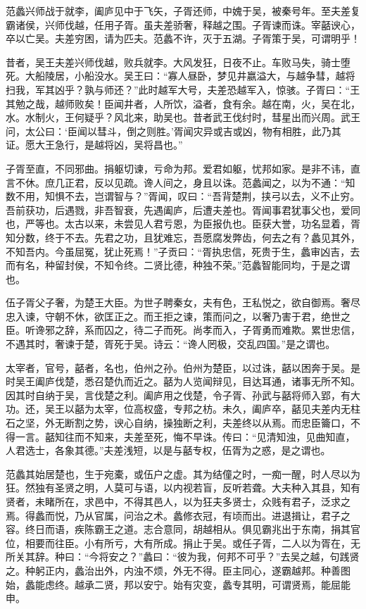 \documentclass[12pt,UTF8]{ctexbook}
\begin{document}
范蠡兴师战于就李，阖庐见中于飞矢，子胥还师，中媿于吴，被秦号年。至夫差复霸诸侯，兴师伐越，任用子胥。虽夫差骄奢，释越之围。子胥谏而诛。宰嚭谀心，卒以亡吴。夫差穷困，请为匹夫。范蠡不许，灭于五湖。子胥策于吴，可谓明乎！

昔者，吴王夫差兴师伐越，败兵就李。大风发狂，日夜不止。车败马失，骑士堕死。大船陵居，小船没水。吴王曰：“寡人昼卧，梦见井嬴溢大，与越争彗，越将扫我，军其凶乎？孰与师还？”此时越军大号，夫差恐越军入，惊骇。子胥曰：“王其勉之哉，越师败矣！臣闻井者，人所饮，溢者，食有余。越在南，火，吴在北，水。水制火，王何疑乎？风北来，助吴也。昔者武王伐纣时，彗星出而兴周。武王问，太公曰：‘臣闻以彗斗，倒之则胜。’胥闻灾异或吉或凶，物有相胜，此乃其证。愿大王急行，是越将凶，吴将昌也。”

子胥至直，不同邪曲。捐躯切谏，亏命为邦。爱君如躯，忧邦如家。是非不讳，直言不休。庶几正君，反以见疏。谗人间之，身且以诛。范蠡闻之，以为不通：“知数不用，知惧不去，岂谓智与？”胥闻，叹曰：“吾背楚荆，挟弓以去，义不止穷。吾前获功，后遇戮，非吾智衰，先遇阖庐，后遭夫差也。胥闻事君犹事父也，爱同也，严等也。太古以来，未尝见人君亏恩，为臣报仇也。臣获大誉，功名显着，胥知分数，终于不去。先君之功，且犹难忘，吾愿腐发弊齿，何去之有？蠡见其外，不知吾内。今虽屈冤，犹止死焉！”子贡曰：“胥执忠信，死贵于生，蠡审凶吉，去而有名，种留封侯，不知令终。二贤比德，种独不荣。”范蠡智能同均，于是之谓也。

伍子胥父子奢，为楚王大臣。为世子聘秦女，夫有色，王私悦之，欲自御焉。奢尽忠入谏，守朝不休，欲匡正之。而王拒之谏，策而问之，以奢乃害于君，绝世之臣。听谗邪之辞，系而囚之，待二子而死。尚孝而入，子胥勇而难欺。累世忠信，不遇其时，奢谏于楚，胥死于吴。诗云：“谗人罔极，交乱四国。”是之谓也。

太宰者，官号，嚭者，名也，伯州之孙。伯州为楚臣，以过诛，嚭以困奔于吴。是时吴王阖庐伐楚，悉召楚仇而近之。嚭为人览闻辩见，目达耳通，诸事无所不知。因其时自纳于吴，言伐楚之利。阖庐用之伐楚，令子胥、孙武与嚭将师入郢，有大功。还，吴王以嚭为太宰，位高权盛，专邦之枋。未久，阖庐卒，嚭见夫差内无柱石之坚，外无断割之势，谀心自纳，操独断之利，夫差终以从焉。而忠臣籥口，不得一言。嚭知往而不知来，夫差至死，悔不早诛。传曰：“见清知浊，见曲知直，人君选士，各象其德。”夫差浅短，以是与嚭专权，伍胥为之惑，是之谓也。

范蠡其始居楚也，生于宛橐，或伍户之虚。其为结僮之时，一痴一醒，时人尽以为狂。然独有圣贤之明，人莫可与语，以内视若盲，反听若聋。大夫种入其县，知有贤者，未睹所在，求邑中，不得其邑人，以为狂夫多贤士，众贱有君子，泛求之焉。得蠡而悦，乃从官属，问治之术。蠡修衣冠，有顷而出。进退揖让，君子之容。终日而语，疾陈霸王之道。志合意同，胡越相从。俱见霸兆出于东南，捐其官位，相要而往臣。小有所亏，大有所成。捐止于吴。或任子胥，二人以为胥在，无所关其辞。种曰：“今将安之？”蠡曰：“彼为我，何邦不可乎？”去吴之越，句践贤之。种躬正内，蠡治出外，内浊不烦，外无不得。臣主同心，遂霸越邦。种善图始，蠡能虑终。越承二贤，邦以安宁。始有灾变，蠡专其明，可谓贤焉，能屈能申。
\end{document}
